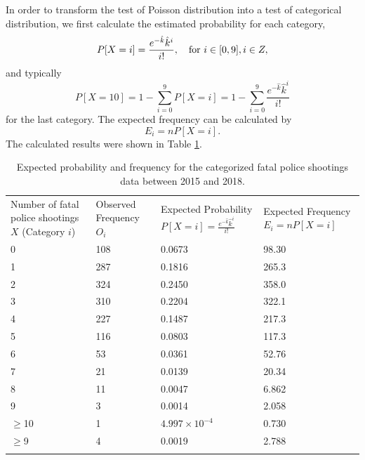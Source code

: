 \documentclass[conf]{new-aiaa}
\begin{document}
In order to transform the test of Poisson distribution into a test of categorical distribution, we first calculate the estimated probability for each category,
$$P[X=i]=\frac{e^{-\hat{k}}\hat{k}^i}{i!},\quad{\rm for\ }i\in[0,9],i\in Z,$$
and typically
$$P[X=10]=1-\sum_{i=0}^9P[X=i]=1-\sum_{i=0}^9\frac{e^{-\hat{k}}\hat{k}^i}{i!}$$
for the last category. The expected frequency can be calculated by
$$E_i=nP[X=i].$$
The calculated results were shown in Table \ref{tab:q3-all-exp}. \medskip

\begin{table}[!htbp]
\centering
\begin{tabular}{m{3cm}<{\centering}m{3cm}<{\centering}m{3cm}<{\centering}m{3cm}<{\centering}}
\toprule 
\toprule
Number of fatal police shootings $X$ (Category $i$)
 & Observed Frequency $O_i$ 
& Expected Probability $P[X=i]=\frac{e^{-\hat{k}}\hat{k}^i}{i!}$ & Expected Frequency $E_i=nP[X=i]$ \\
\noalign{\smallskip}\hline\noalign{\smallskip}
0  &   108   & 0.0673  & 98.30\\
1  &   287   & 0.1816   & 265.3\\
2  &   324   & 0.2450   & 358.0\\
3  &   310   & 0.2204   & 322.1\\
4  &   227   & 0.1487   & 217.3\\
5  &   116   & 0.0803  & 117.3\\
6  &   53    & 0.0361  & 52.76\\
7  &   21    & 0.0139  & 20.34\\
8  &   11    & 0.0047  & 6.862\\
9  &   3     & 0.0014 & 2.058\\
$\geqslant$10 &   1     & $4.997\times10^{-4}$& 0.730\\\hline
$\geqslant$9 &   4     & 0.0019& 2.788\\
\bottomrule 
\bottomrule  \smallskip
\end{tabular}
\caption{Expected probability and frequency for the categorized fatal police shootings data between 2015 and 2018.}
\label{tab:q3-all-exp}
\end{table}
\end{document}
